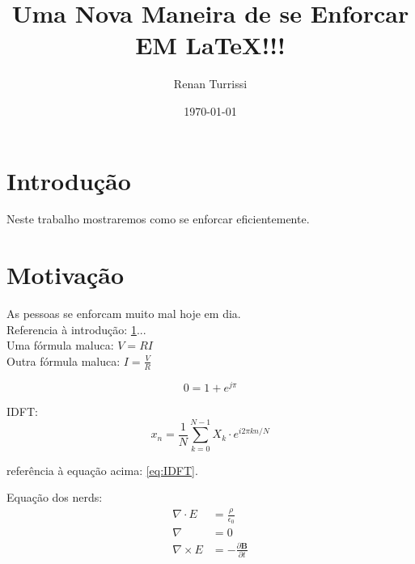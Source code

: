 \documentclass{article}
\author{Renan Turrissi}
\date{\today}
\title{Uma Nova Maneira de se Enforcar EM \LaTeX !!!}
\newcommand{\vetor}[1]{\textbf{#1}}
\begin{document}
\maketitle

\newpage

\section{Introdução}\label{sec:intro}
Neste trabalho mostraremos como se enforcar eficientemente.

\section{Motivação}\label{sec:motiv}
As pessoas se enforcam muito mal hoje em dia.\\
Referencia à introdução: \ref{sec:intro}...\\
Uma fórmula maluca: $ V =RI $ \\
Outra fórmula maluca: $ I = \frac{V}{R} $

$$ 0 = 1+e^{j\pi}  $$

IDFT: 
\begin{equation} \label{eq:IDFT}
 x_n = \frac{1}{N}\sum_{k=0}^{N-1} X_k \cdot e^{i2\pi kn/N} 
\end{equation}

referência à equação acima: \ref{eq:IDFT}.

Equação dos nerds:
\begin{align}
\nabla \cdot E & = \frac{\rho}{\epsilon_0} \\
\nabla  & = 0 \\
\nabla \times E & = -\frac{\partial \vetor{B}}{\partial t}
\end{align}
\end{document}
